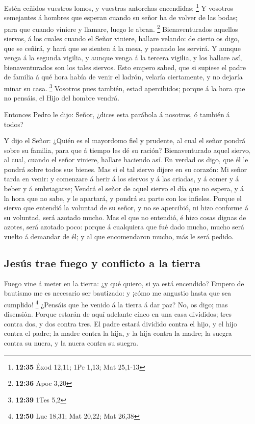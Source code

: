  Estén ceñidos vuestros lomos, y vuestras antorchas
encendidas; \footnote{\textbf{12:35} Éxod 12,11; 1Pe 1,13; Mat 25,1-13}
 Y vosotros semejantes á hombres que esperan cuando su
señor ha de volver de las bodas; para que cuando viniere y llamare,
luego le abran. \footnote{\textbf{12:36} Apoc 3,20} 
Bienaventurados aquellos siervos, á los cuales cuando el Señor viniere,
hallare velando: de cierto os digo, que se ceñirá, y hará que se sienten
á la mesa, y pasando les servirá.  Y aunque venga á la
segunda vigilia, y aunque venga á la tercera vigilia, y los hallare así,
bienaventurados son los tales siervos.  Esto empero sabed,
que si supiese el padre de familia á qué hora había de venir el ladrón,
velaría ciertamente, y no dejaría minar su casa. \footnote{\textbf{12:39}
  1Tes 5,2}  Vosotros pues también, estad apercibidos;
porque á la hora que no pensáis, el Hijo del hombre vendrá.

 Entonces Pedro le dijo: Señor, ¿dices esta parábola á
nosotros, ó también á todos?

 Y dijo el Señor: ¿Quién es el mayordomo fiel y prudente,
al cual el señor pondrá sobre su familia, para que á tiempo les dé su
ración?  Bienaventurado aquel siervo, al cual, cuando el
señor viniere, hallare haciendo así.  En verdad os digo,
que él le pondrá sobre todos sus bienes.  Mas si el tal
siervo dijere en su corazón: Mi señor tarda en venir: y comenzare á
herir á los siervos y á las criadas, y á comer y á beber y á
embriagarse;  Vendrá el señor de aquel siervo el día que no
espera, y á la hora que no sabe, y le apartará, y pondrá su parte con
los infieles.  Porque el siervo que entendió la voluntad de
su señor, y no se apercibió, ni hizo conforme á su voluntad, será
azotado mucho.  Mas el que no entendió, é hizo cosas dignas
de azotes, será azotado poco: porque á cualquiera que fué dado mucho,
mucho será vuelto á demandar de él; y al que encomendaron mucho, más le
será pedido.

\hypertarget{jesuxfas-trae-fuego-y-conflicto-a-la-tierra}{%
\subsection{Jesús trae fuego y conflicto a la
tierra}\label{jesuxfas-trae-fuego-y-conflicto-a-la-tierra}}

 Fuego vine á meter en la tierra: ¿y qué quiero, si ya está
encendido?  Empero de bautismo me es necesario ser
bautizado: y ¡cómo me angustio hasta que sea cumplido! \footnote{\textbf{12:50}
  Luc 18,31; Mat 20,22; Mat 26,38}  ¿Pensáis que he venido
á la tierra á dar paz? No, os digo; mas disensión.  Porque
estarán de aquí adelante cinco en una casa divididos; tres contra dos, y
dos contra tres.  El padre estará dividido contra el hijo,
y el hijo contra el padre; la madre contra la hija, y la hija contra la
madre; la suegra contra su nuera, y la nuera contra su suegra.

